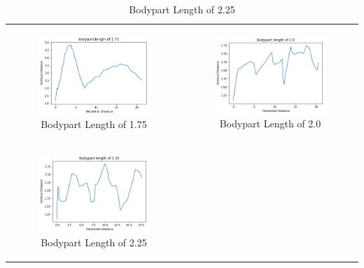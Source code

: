 \documentclass[12pt,oneside,listof=totoc,paper=a4,headings=small]{scrbook}
\begin{document}
{\begin{table}[h!]
\begin{tabular}{cc}
\newline
\begin{subfigure}{0.4\textwidth}\centering\includegraphics[width=0.75\columnwidth]{images/length_175.png}\caption{Bodypart Length of 1.75}\label{fig:lengthtabg}\end{subfigure}&
\begin{subfigure}{0.4\textwidth}\centering\includegraphics[width=0.75\columnwidth]{images/length_20.png}\caption{Bodypart Length of 2.0}\label{fig:lengthtabh}\end{subfigure}\\
\newline
\begin{subfigure}{0.4\textwidth}\centering\includegraphics[width=0.75\columnwidth]{images/length_225.png}\caption{Bodypart Length of 2.25}\label{fig:lengthtabi}\end{subfigure}&

\end{tabular}
\end{table}}
\end{document}

